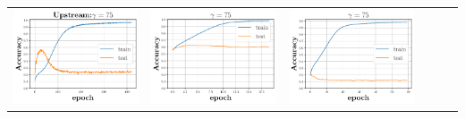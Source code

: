\begin{minipage}{0.99\columnwidth}
{\begin{tabular}{cccccc}
\\
\includegraphics[scale=0.125]{figs/relu_75.pdf}&
\includegraphics[scale=0.125]{figs/galu_75_good.pdf}&
\includegraphics[scale=0.125]{figs/galu_75_bad.pdf}&

\end{tabular}}
\end{minipage}
